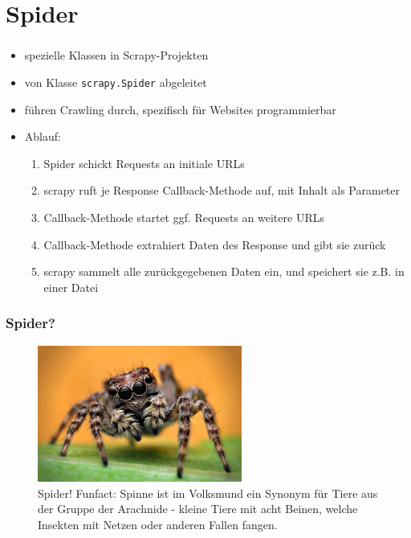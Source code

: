 \documentclass{beamer}
\begin{document}
\section{Spider}
\begin{frame}[fragile]
	\frametitle{\insertsection}
	\begin{itemize}
		\item spezielle Klassen in Scrapy-Projekten
		\item von Klasse \verb|scrapy.Spider| abgeleitet
		\item führen Crawling durch, spezifisch für Websites programmierbar
		\item Ablauf: \begin{enumerate}		
			\item Spider schickt Requests an initiale URLs
			\item scrapy ruft je Response Callback-Methode auf, mit Inhalt als Parameter
			\item Callback-Methode startet ggf. Requests an weitere URLs
			\item Callback-Methode extrahiert Daten des Response und gibt sie zurück
			\item scrapy sammelt alle zurückgegebenen Daten ein, und speichert sie z.B. in einer Datei
		\end{enumerate}
	\end{itemize}
\end{frame}


\begin{frame}[fragile]
	\frametitle{Spider?}	
	\begin{figure}
		\begin{center}
			\includegraphics[width=0.6\textwidth]{texsrc/Spider_cute}
		\end{center}
		\caption{Spider! Funfact: Spinne ist im Volksmund ein Synonym für Tiere aus
		der Gruppe der Arachnide - kleine Tiere mit acht Beinen, welche Insekten mit Netzen oder
		anderen Fallen fangen.}
		\label{fig:Spider}
	\end{figure}
\end{frame}
\end{document}
